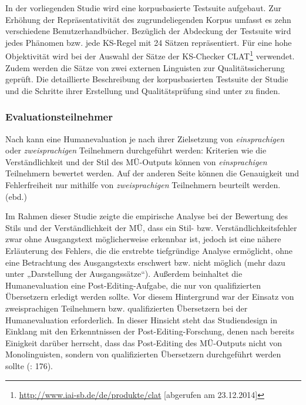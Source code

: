 In der vorliegenden Studie wird eine korpusbasierte Testsuite aufgebaut. Zur Erhöhung der Repräsentativität des zugrundeliegenden Korpus umfasst es zehn verschiedene Benutzerhandbücher. Bezüglich der Abdeckung der Testsuite wird jedes Phänomen bzw. jede KS-Regel mit 24 Sätzen repräsentiert. Für eine hohe Objektivität wird bei der Auswahl der Sätze der KS-Checker CLAT\footnote{\url{http://www.iai-sb.de/de/produkte/clat} [abgerufen am 23.12.2014]} \citep{Rösener2010} verwendet. Zudem werden die Sätze von zwei externen Linguisten zur Qualitätssicherung geprüft. Die detaillierte Beschreibung der korpusbasierten Testsuite der Studie und die Schritte ihrer Erstellung und Qualitätsprüfung sind unter  zu finden.

\subsubsection{Evaluationsteilnehmer}


Nach \citet[65]{Weber1998} kann eine Humanevaluation je nach ihrer Zielsetzung von \textit{einsprachigen} oder \textit{zweisprachigen} Teilnehmern durchgeführt werden: Kriterien wie die Verständlichkeit und der Stil des MÜ-Outputs können von \textit{einsprachigen} Teilnehmern bewertet werden. Auf der anderen Seite können die Genauigkeit und Fehlerfreiheit nur mithilfe von \textit{zweisprachigen} Teilnehmern beurteilt werden. (ebd.)

Im Rahmen dieser Studie zeigte die empirische Analyse bei der Bewertung des Stils und der Verständlichkeit der MÜ, dass ein Stil- bzw. Verständlichkeitsfehler zwar ohne Ausgangstext möglicherweise erkennbar ist, jedoch ist eine nähere Erläuterung des Fehlers, die die erstrebte tiefgründige Analyse ermöglicht, ohne eine Betrachtung des Ausgangstexts erschwert bzw. nicht möglich (mehr dazu unter  „Darstellung der Ausgangssätze“). Außerdem beinhaltet die Humanevaluation eine Post-Editing-Aufgabe, die nur von qualifizierten Übersetzern erledigt werden sollte. Vor diesem Hintergrund war der Einsatz von zweisprachigen Teilnehmern bzw. qualifizierten Übersetzern bei der Humanevaluation erforderlich. In dieser Hinsicht steht das Studiendesign in Einklang mit den Erkenntnissen der Post-Editing-Forschung, denen nach bereits Einigkeit darüber herrscht, dass das Post-Editing des MÜ-Outputs nicht von Monolinguisten, sondern von qualifizierten Übersetzern durchgeführt werden sollte (\citealt{Hansen-SchirraEtAl2017}: 176).


